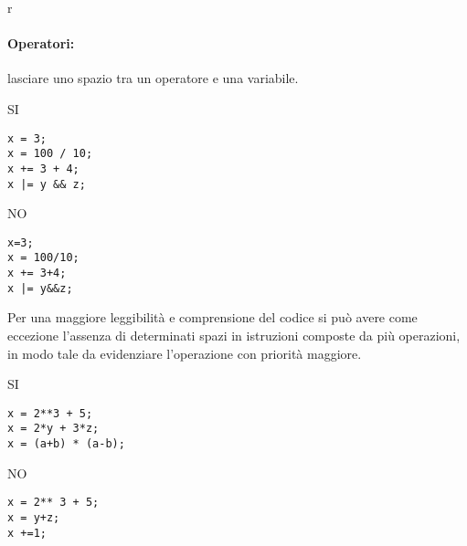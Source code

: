 r\documentclass[../ProcessiPrimari.tex]{subfiles}
\begin{document}
\paragraph*{Operatori: }
lasciare uno spazio tra un operatore e una variabile.
\begin{center}{
\begin{minipage}{5cm}
{\begin{center}SI\end{center}}
\begin{Verbatim}[frame=single]
x = 3;
x = 100 / 10;
x += 3 + 4;
x |= y && z;
\end{Verbatim}
\end{minipage}
\hfil
\begin{minipage}{5cm}
{\begin{center}NO\end{center}}
\begin{Verbatim}[frame=single]
x=3;
x = 100/10;
x += 3+4;
x |= y&&z;
\end{Verbatim}
\end{minipage}
}
\end{center}
Per una maggiore leggibilità e comprensione del codice si può avere come eccezione l'assenza di determinati spazi in istruzioni composte da più operazioni, in modo tale da evidenziare l'operazione con priorità maggiore.
\begin{center}{
\begin{minipage}{5cm}
{\begin{center}SI\end{center}}
\begin{Verbatim}[frame=single]
x = 2**3 + 5;
x = 2*y + 3*z;
x = (a+b) * (a-b);
\end{Verbatim}
\end{minipage}
\hfil
\begin{minipage}{5cm}
{\begin{center}NO\end{center}}
\begin{Verbatim}[frame=single]
x = 2** 3 + 5;
x = y+z;
x +=1;
\end{Verbatim}
\end{minipage}
}
\end{center}
\end{document}
